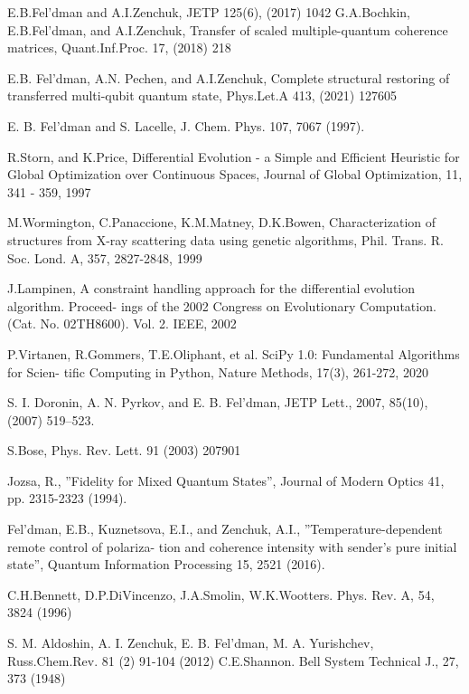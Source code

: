 \begin{thebibliography}{}
 E.B.Fel'dman and A.I.Zenchuk, JETP 125(6), (2017) 1042
 G.A.Bochkin, E.B.Fel’dman, and A.I.Zenchuk, Transfer of scaled multiple-quantum coherence matrices, Quant.Inf.Proc. 17, (2018) 218

 E.B. Fel'dman, A.N. Pechen, and A.I.Zenchuk, Complete structural restoring of transferred multi-qubit quantum state, Phys.Let.A 413, (2021) 127605

 E. B. Fel'dman and S. Lacelle, J. Chem. Phys. 107, 7067 (1997).

 R.Storn, and K.Price, Differential Evolution - a Simple and Efficient Heuristic for Global
Optimization over Continuous Spaces, Journal of Global Optimization, 11, 341 - 359, 1997

 M.Wormington, C.Panaccione, K.M.Matney, D.K.Bowen, Characterization of structures from
X-ray scattering data using genetic algorithms, Phil. Trans. R. Soc. Lond. A, 357, 2827-2848, 1999

 J.Lampinen, A constraint handling approach for the differential evolution algorithm. Proceed-
ings of the 2002 Congress on Evolutionary Computation. (Cat. No. 02TH8600). Vol. 2. IEEE, 2002

 P.Virtanen, R.Gommers, T.E.Oliphant, et al. SciPy 1.0: Fundamental Algorithms for Scien-
tific Computing in Python, Nature Methods, 17(3), 261-272, 2020

 S. I. Doronin, A. N. Pyrkov, and E. B. Fel'dman, JETP Lett., 2007, 85(10), (2007) 519–523.

 S.Bose, Phys. Rev. Lett. 91 (2003) 207901

 Jozsa, R., ”Fidelity for Mixed Quantum States”, Journal of Modern Optics 41, pp. 2315-2323 (1994).

 Fel'dman, E.B., Kuznetsova, E.I., and Zenchuk, A.I., ”Temperature-dependent remote control of polariza- tion and coherence intensity with sender’s pure initial state”, Quantum Information Processing 15, 2521 (2016).

 C.H.Bennett, D.P.DiVincenzo, J.A.Smolin, W.K.Wootters.
Phys. Rev. A, 54, 3824 (1996)

  S. M. Aldoshin, A. I. Zenchuk, E. B. Fel'dman, M. A. Yurishchev, Russ.Chem.Rev. 81 (2) 91-104 (2012)
 C.E.Shannon. Bell System Technical J., 27, 373 (1948)
\end{thebibliography}